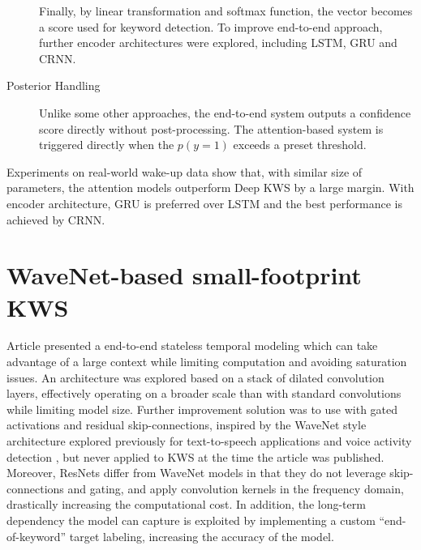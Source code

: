 \begin{description}
\begin{itemize}
            \end{itemize}

            Finally, by linear transformation and softmax function, the vector becomes a score used for keyword detection.
            To improve end-to-end approach, further encoder architectures were explored, including LSTM, GRU and CRNN.

            \item[Posterior Handling] Unlike some other approaches, the end-to-end system outputs a confidence score directly without post-processing.
            The attention-based system is triggered directly when the $p(y=1)$ exceeds a preset threshold.
        \end{description}

        Experiments on real-world wake-up data show that, with similar size of parameters, the attention models outperform Deep KWS by a large margin. 
        With encoder architecture, GRU is preferred over LSTM and the best performance is achieved by CRNN.

    \section{WaveNet-based small-footprint KWS} \label{sec:related_wavenet}

        Article \cite{wavenet} presented a end-to-end stateless temporal modeling which can take advantage of a large context while limiting computation and avoiding saturation issues.
        An architecture was explored based on a stack of dilated convolution layers, effectively operating on a broader scale than with standard convolutions while limiting model size. 
        Further improvement solution was to use with gated activations and residual skip-connections, inspired by the WaveNet style architecture explored previously for text-to-speech applications \cite{wavenet} and voice activity detection \cite{wavenet}, but never applied to KWS at the time the article was published.
        Moreover, ResNets differ from WaveNet models in that they do not leverage skip-connections and gating, and apply convolution kernels in the frequency domain, drastically increasing the computational cost.
        In addition, the long-term dependency the model can capture is exploited by implementing a custom ``end-of-keyword'' target labeling, increasing the accuracy of the model.

